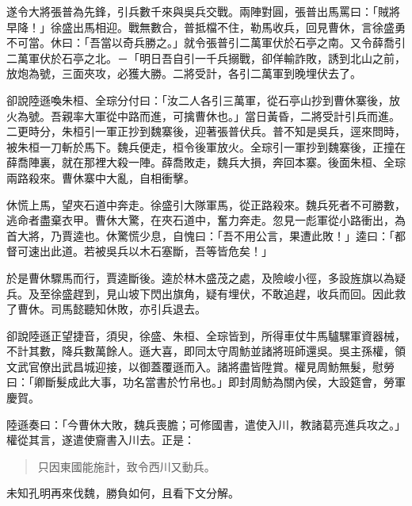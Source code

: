 遂令大將張普為先鋒，引兵數千來與吳兵交戰。兩陣對圓，張普出馬罵曰：「賊將早降！」徐盛出馬相迎。戰無數合，普抵檔不住，勒馬收兵，回見曹休，言徐盛勇不可當。休曰：「吾當以奇兵勝之。」就令張普引二萬軍伏於石亭之南。又令薛喬引二萬軍伏於石亭之北。－「明日吾自引一千兵搦戰，卻佯輸詐敗，誘到北山之前，放炮為號，三面夾攻，必獲大勝。二將受計，各引二萬軍到晚埋伏去了。

卻說陸遜喚朱桓、全琮分付曰：「汝二人各引三萬軍，從石亭山抄到曹休寨後，放火為號。吾親率大軍從中路而進，可擒曹休也。」當日黃昏，二將受計引兵而進。二更時分，朱桓引一軍正抄到魏寨後，迎著張普伏兵。普不知是吳兵，逕來問時，被朱桓一刀斬於馬下。魏兵便走，桓令後軍放火。全琮引一軍抄到魏寨後，正撞在薛喬陣裏，就在那裡大殺一陣。薛喬敗走，魏兵大損，奔回本寨。後面朱桓、全琮兩路殺來。曹休寨中大亂，自相衝擊。

休慌上馬，望夾石道中奔走。徐盛引大隊軍馬，從正路殺來。魏兵死者不可勝數，逃命者盡棄衣甲。曹休大驚，在夾石道中，奮力奔走。忽見一彪軍從小路衝出，為首大將，乃賈逵也。休驚慌少息，自愧曰：「吾不用公言，果遭此敗！」逵曰：「都督可速出此道。若被吳兵以木石塞斷，吾等皆危矣！」

於是曹休驟馬而行，賈逵斷後。逵於林木盛茂之處，及險峻小徑，多設旌旗以為疑兵。及至徐盛趕到，見山坡下閃出旗角，疑有埋伏，不敢追趕，收兵而回。因此救了曹休。司馬懿聽知休敗，亦引兵退去。

卻說陸遜正望捷音，須臾，徐盛、朱桓、全琮皆到，所得車仗牛馬驢騾軍資器械，不計其數，降兵數萬餘人。遜大喜，即同太守周魴並諸將班師還吳。吳主孫權，領文武官僚出武昌城迎接，以御蓋覆遜而入。諸將盡皆陞賞。權見周魴無髮，慰勞曰：「卿斷髮成此大事，功名當書於竹帛也。」即封周魴為關內侯，大設筵會，勞軍慶賀。

陸遜奏曰：「今曹休大敗，魏兵喪膽；可修國書，遣使入川，教諸葛亮進兵攻之。」權從其言，遂遣使齎書入川去。正是：

\begin{quote}
只因東國能施計，致令西川又動兵。
\end{quote}

未知孔明再來伐魏，勝負如何，且看下文分解。
